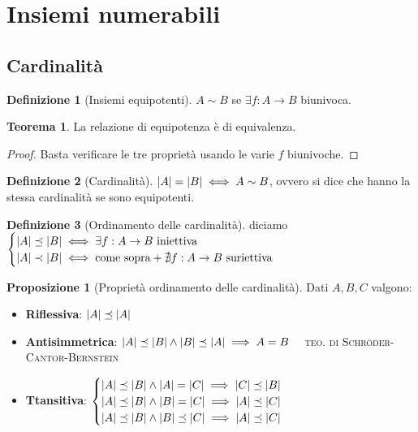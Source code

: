 \documentclass[a4paper,10pt]{article}
\theoremstyle{definition}
\theoremstyle{indentdefinition}
\newtheorem{defn}{Definizione}[section]
\theoremstyle{indentpostulate}
\theoremstyle{indenttheorem}
\newtheorem{thm}{Teorema}[section]
\newtheorem{prop}{Proposizione}[section]
\theoremstyle{myremark}
\theoremstyle{indentgeneral}
\begin{document}
\section{Insiemi numerabili}
\subsection{Cardinalità}
\begin{defn}[Insiemi equipotenti] $A\sim B$ se $\exists f:A\to B$ biunivoca. 
\end{defn}

\begin{thm}
    La relazione di equipotenza è di equivalenza.
\end{thm}

\begin{proof}
    Basta verificare le tre proprietà usando le varie $f$ biunivoche.
\end{proof}

\begin{defn}[Cardinalità]
    $\abs{A}=\abs{B}\iff A\sim B$, ovvero si dice che hanno la stessa cardinalità se sono equipotenti.
\end{defn}

\begin{defn}[Ordinamento delle cardinalità] diciamo $\begin{cases}
    \abs{A}\preceq\abs{B}\iff \exists f:A\to B \text{ iniettiva}\\
    \abs{A}\prec\abs{B}\iff \text{come sopra}+\nexists f:A\to B \text{ suriettiva}
\end{cases}$
\end{defn}

\begin{prop}[Proprietà ordinamento delle cardinalità] Dati $A,B,C$ valgono:
    \begin{itemize}
        \item \textbf{Riflessiva}: $\abs{A}\preceq\abs{A}$
        \item \textbf{Antisimmetrica}: $\abs{A}\preceq\abs{B}\land\abs{B}\preceq\abs{A}\implies A=B\quad$ \textsc{teo. di Schröder-Cantor-Bernstein}
        \item \textbf{Ttansitiva}: $\begin{cases}
            \abs{A}\preceq\abs{B}\land\abs{A}=\abs{C}\implies \abs{C}\preceq\abs{B}\\
            \abs{A}\preceq\abs{B}\land\abs{B}=\abs{C}\implies \abs{A}\preceq\abs{C}\\
            \abs{A}\preceq\abs{B}\land\abs{B}\preceq\abs{C}\implies \abs{A}\preceq\abs{C}\\
        \end{cases}$
    \end{itemize}
\end{prop}
\end{document}
